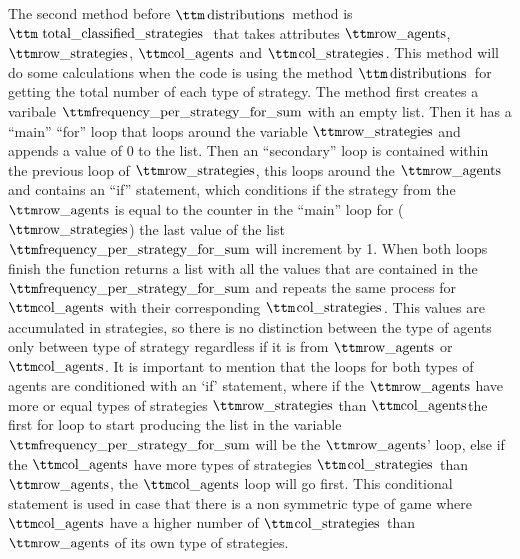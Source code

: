 The second method before $\pythoninline{distributions}$ method is $\pythoninline{total\_classified\_strategies}$ that takes attributes $\pythoninline{row\_agents}$, $\pythoninline{row\_strategies}$, $\pythoninline{col\_agents}$ and $\pythoninline{col\_strategies}$. This method will do some calculations when the code is using the method $\pythoninline{distributions}$ for getting the total number of each type of strategy.   The method first creates a varibale $\pythoninline{frequency\_per\_strategy\_for\_sum}$ with an empty list. Then it has a ``main'' ``for'' loop that loops around the variable $\pythoninline{row\_strategies}$ and appends a value of 0 to the list. Then an ``secondary'' loop is contained within the previous loop of $\pythoninline{row\_strategies}$, this loops around the $\pythoninline{row\_agents}$ and contains an ``if'' statement, which conditions if  the strategy from the $\pythoninline{row\_agents}$ is equal to the counter in the ``main'' loop for ($\pythoninline{row\_strategies}$) the last value of the list $\pythoninline{frequency\_per\_strategy\_for\_sum}$ will increment by 1. When both loops finish the function returns a list with all the values that are contained in the $\pythoninline{frequency\_per\_strategy\_for\_sum}$ and repeats the same process for $\pythoninline{col\_agents}$ with their corresponding $\pythoninline{col\_strategies}$. This values are accumulated in strategies, so there is no distinction between the type of agents only between type of strategy regardless if it is from $\pythoninline{row\_agents}$ or $\pythoninline{col\_agents}$. It is important to mention that the loops for both types of agents are conditioned with an `if' statement, where if the $\pythoninline{row\_agents}$ have more or equal types of strategies $\pythoninline{row\_strategies}$ than $\pythoninline{col\_agents}$the first for loop to start producing the list in the variable $\pythoninline{frequency\_per\_strategy\_for\_sum}$ will be the $\pythoninline{row\_agents}$' loop, else if the $\pythoninline{col\_agents}$ have more types of strategies $\pythoninline{col\_strategies}$ than $\pythoninline{row\_agents}$, the $\pythoninline{col\_agents}$ loop will go first. This conditional statement is used in case that there is a non symmetric type of game where $\pythoninline{col\_agents}$ have a higher number of $\pythoninline{col\_strategies}$ than $\pythoninline{row\_agents}$ of its own type of strategies.

